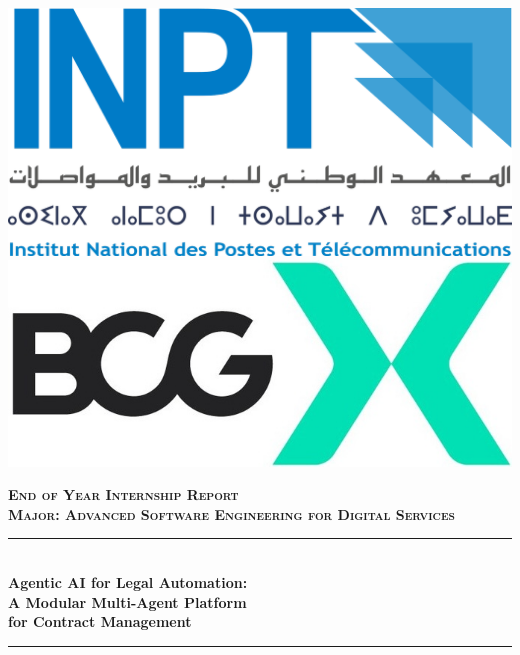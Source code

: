 \begin{titlepage}
  \thispagestyle{empty}
  
  \vspace{0.7cm}

  \includegraphics[scale=0.1]{Images/Logo_inpt.png} 
  \hfill 
  \includegraphics[scale=0.45]{Images/BCG_X.jpg}

  \vspace{0.8cm}
  \begin{center}
  {\large \textsc{\textbf{End of Year Internship Report}}}\\[0.1cm]
  {\large \textsc{\textbf{Major: \textbf{Advanced Software Engineering for Digital Services}}}} \\[0.1cm]
  \vspace{0.8cm}

  \rule{\linewidth}{0.3mm} \\[0.6cm]   %
  {\huge \textbf{Agentic AI for Legal Automation:} \\[0.2cm] \vspace{0.1cm} \textbf{A Modular Multi-Agent Platform} \\[0.3cm] \vspace{0.15cm} \textbf{for Contract Management}}\\ [0.6cm]
  \rule{\linewidth}{0.4mm} \\[0.4cm]
  \vspace{1.3cm}


\end{center}
\end{titlepage}
